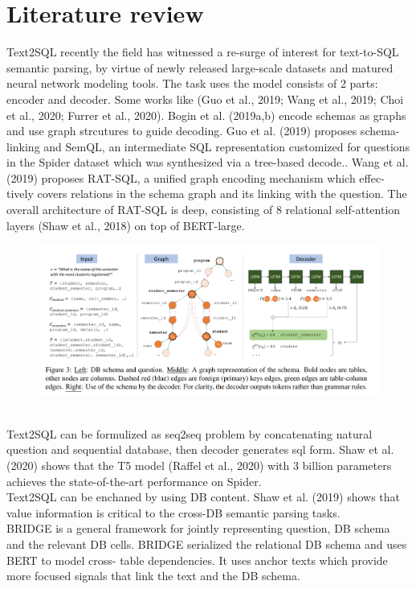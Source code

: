 \documentclass[10pt,a4paper]{article}
\begin{document}
\section{Literature review}
Text2SQL recently the field has witnessed a re-surge of interest for text-to-SQL semantic parsing, by virtue of newly released large-scale datasets and matured neural network modeling tools. The task uses the model consists of 2 parts: encoder and decoder. Some works like  (Guo et al., 2019; Wang et al.,
2019; Choi et al., 2020; Furrer et al., 2020). Bogin
et al. (2019a,b) encode schemas as graphs and use graph strcutures to guide decoding.  Guo et al. (2019) proposes schema-linking and SemQL, an intermediate SQL representation customized for questions in the Spider dataset which was synthesized via a tree-based decode.. Wang et al. (2019) proposes RAT-SQL, a unified graph encoding mechanism which effec-tively covers relations in the schema graph and its linking with the question. The overall architecture of RAT-SQL is deep, consisting of 8 relational self-attention layers (Shaw et al., 2018) on top of BERT-large.
\begin{figure}[htbp] 
\begin{center}
\includegraphics[scale=0.3]{./image/3.png}
\end{center}
\end{figure}
\\ 
Text2SQL can be formulized as seq2seq problem by concatenating natural question and sequential database, then decoder generates sql form. Shaw et al. (2020) shows that the T5 model (Raffel
et al., 2020) with 3 billion parameters achieves the
state-of-the-art performance on Spider. \\
Text2SQL can be enchaned by using DB content. Shaw et al. (2019) shows
that value information is critical to the cross-DB
semantic parsing tasks. \\
BRIDGE is a general framework for jointly representing question, DB schema
and the relevant DB cells. BRIDGE serialized the relational DB schema and uses BERT to model cross-
table dependencies. It uses anchor texts which provide more focused signals that link the text and the DB schema.
\end{document}
